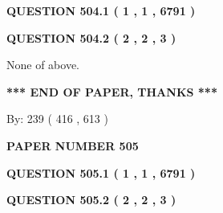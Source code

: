\documentclass[12pt]{article}
\begin{document}
   
  
\vspace{0.2in}
  
{\textbf{\Large{QUESTION
504.1 
 ( 1 , 1 , 6791 )
}}}
  
  
  
\vspace{0.2in}
  
{\textbf{\Large{QUESTION
504.2 
 ( 2 , 2 , 3 )
}}}
  
  
 
 
\noindent{}
 
 
 None of above.
 
 
 
 
   
   
 \vspace{0.2in}
 
   
   
   
   
\vspace{1.0in} 
{\textbf{\large{ *** END OF PAPER, THANKS *** }}} 
   
   
\hspace{1.0in} By: 
 239 ( 416 ,  613 )
   
   
   
   
\newpage 
\setcounter{page}{ 
   505001 } 
   
   
   
   
 {\textbf{ \Large{ PAPER NUMBER  505  }}}
   
   
\vspace{0.2in}
   
   
   
   
   
   
 \vspace{0.2in}
 
 
 
 
   
   
  
\vspace{0.2in}
  
{\textbf{\Large{QUESTION
505.1 
 ( 1 , 1 , 6791 )
}}}
  
  
  
\vspace{0.2in}
  
{\textbf{\Large{QUESTION
505.2 
 ( 2 , 2 , 3 )
}}}
  
\end{document}
